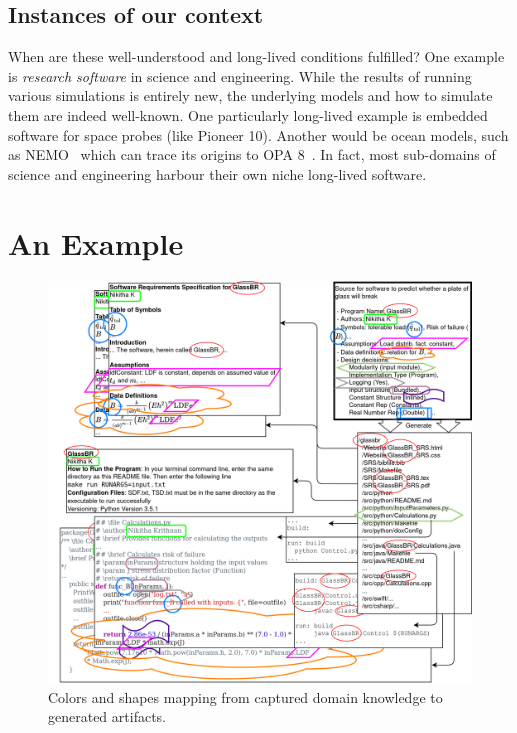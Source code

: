 \documentclass[a4paper,UKenglish,cleveref,autoref,thm-restate]{oasics-v2021}
\begin{document}
\subsection{Instances of our context}
\label{subsec:examples-of-context}

When are these well-understood and long-lived conditions fulfilled? One example
is \emph{research software} in science and engineering. While the results of
running various simulations is entirely new, the underlying models and how to
simulate them are indeed well-known. One particularly long-lived example is
embedded software for space probes (like Pioneer 10). Another would be ocean
models, such as NEMO~\cite{madec_gurvan_2022_6334656} which can trace its
origins to OPA 8~\cite{Madec1998}. In fact, most sub-domains of science and engineering
harbour their own niche long-lived software.

\section{An Example}
\label{sec:example}

\begin{figure}[t]
  \centering
  \includegraphics[width=\linewidth]{assets/DrasilSupportsChange-right-portrait-overlapped-ungrouped-11ptFont-squished-blind-v1-300dpi.png}
  \caption{Colors and shapes mapping from captured domain knowledge to generated
  artifacts.}
  \label{Fig_DrasilAndChange}
\end{figure}
\end{document}
